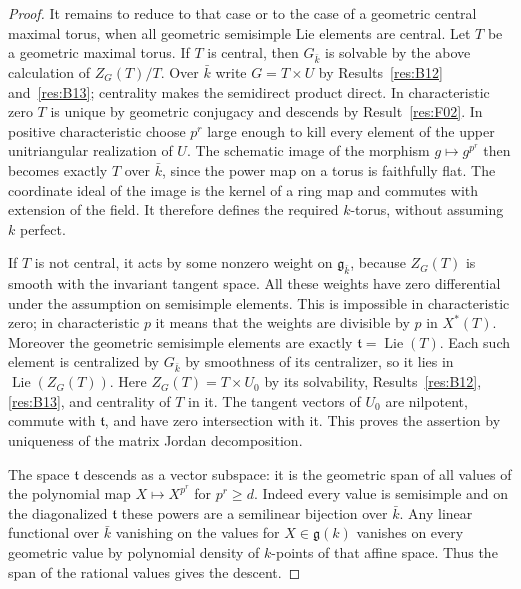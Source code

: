 \documentclass[11pt,a4paper,openany,oneside]{book}
\theoremstyle{resultstyle}
\theoremstyle{definition}
\numberwithin{equation}{chapter}
\DeclareMathOperator{\Lie}{Lie}
\begin{document}
\begin{proof}
It remains to reduce to that case or to the case of a
geometric central maximal torus, when all geometric
semisimple Lie elements are central. Let \(T\) be a
geometric maximal torus. If \(T\) is central, then \(G_{\bar k}\)
is solvable by the above calculation of \(Z_G(T)/T\).
Over \(\bar k\) write \(G=T\times U\) by
Results~\ref{res:B12} and~\ref{res:B13}; centrality makes the
semidirect product direct. In characteristic zero \(T\)
is unique by geometric conjugacy and descends by
Result~\ref{res:F02}. In positive characteristic choose
\(p^r\) large enough to kill every element of the upper
unitriangular realization of \(U\). The schematic image
of the morphism \(g\mapsto g^{p^r}\) then becomes exactly
\(T\) over \(\bar k\), since the power map on a torus is
faithfully flat. The coordinate ideal of the image is the
kernel of a ring map and commutes with extension of the
field. It therefore defines the required \(k\)-torus,
without assuming \(k\) perfect.

If \(T\) is not central, it acts by some nonzero weight on
\(\mathfrak g_{\bar k}\), because \(Z_G(T)\) is smooth
with the invariant tangent space. All these weights have
zero differential under the assumption on semisimple
elements. This is impossible in characteristic zero;
in characteristic \(p\) it means that the weights are
divisible by \(p\) in \(X^*(T)\).
Moreover the geometric semisimple elements are exactly
\(\mathfrak t=\Lie(T)\). Each such element is centralized
by \(G_{\bar k}\) by smoothness of its centralizer, so it
lies in \(\Lie(Z_G(T))\). Here \(Z_G(T)=T\times U_0\)
by its solvability, Results~\ref{res:B12}, \ref{res:B13},
and centrality of \(T\) in it. The tangent vectors of \(U_0\)
are nilpotent, commute with \(\mathfrak t\), and have zero
intersection with it. This proves the assertion by uniqueness
of the matrix Jordan decomposition.

The space \(\mathfrak t\) descends as a vector subspace:
it is the geometric span of all values of the polynomial
map \(X\mapsto X^{p^r}\) for \(p^r\ge d\).
Indeed every value is semisimple and on the diagonalized
\(\mathfrak t\) these powers are a semilinear bijection
over \(\bar k\). Any linear functional over \(\bar k\)
vanishing on the values for \(X\in\mathfrak g(k)\)
vanishes on every geometric value by polynomial density
of \(k\)-points of that affine space. Thus the span of the
rational values gives the descent.


\end{proof}
\end{document}
